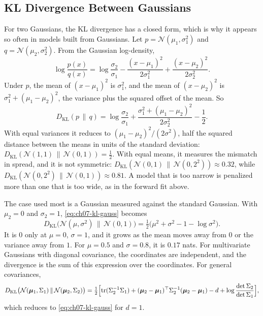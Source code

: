 \subsection{KL Divergence Between Gaussians}
\label{sec:ch07-kl-gaussian}

For two Gaussians, the KL divergence has a closed form, which is why it
appears so often in models built from Gaussians. Let $p =
\mathcal{N}(\mu_1, \sigma_1^2)$ and $q = \mathcal{N}(\mu_2, \sigma_2^2)$.
From the Gaussian log-density,
\[
  \log \frac{p(x)}{q(x)}
  = \log \frac{\sigma_2}{\sigma_1}
  - \frac{(x - \mu_1)^2}{2\sigma_1^2} + \frac{(x - \mu_2)^2}{2\sigma_2^2} .
\]
Under $p$, the mean of $(x - \mu_1)^2$ is $\sigma_1^2$, and the mean of
$(x - \mu_2)^2$ is $\sigma_1^2 + (\mu_1 - \mu_2)^2$, the variance plus the
squared offset of the mean. So
\begin{equation}
  D_{\mathrm{KL}}(p \,\|\, q)
  = \log \frac{\sigma_2}{\sigma_1}
  + \frac{\sigma_1^2 + (\mu_1 - \mu_2)^2}{2\sigma_2^2} - \frac12 .
  \label{eq:ch07-kl-gauss}
\end{equation}
With equal variances it reduces to $(\mu_1 - \mu_2)^2/(2\sigma^2)$, half
the squared distance between the means in units of the standard
deviation: $D_{\mathrm{KL}}(\mathcal{N}(1, 1) \,\|\, \mathcal{N}(0, 1)) =
\tfrac12$. With equal means, it measures the mismatch in spread, and it
is not symmetric: $D_{\mathrm{KL}}(\mathcal{N}(0, 1) \,\|\, \mathcal{N}(0,
2^2)) \approx 0.32$, while $D_{\mathrm{KL}}(\mathcal{N}(0, 2^2) \,\|\,
\mathcal{N}(0, 1)) \approx 0.81$. A model that is too narrow is penalized
more than one that is too wide, as in the forward fit above.

The case used most is a Gaussian measured against the standard Gaussian.
With $\mu_2 = 0$ and $\sigma_2 = 1$, \cref{eq:ch07-kl-gauss} becomes
\[
  D_{\mathrm{KL}}\bigl(\mathcal{N}(\mu, \sigma^2) \,\|\, \mathcal{N}(0, 1)\bigr)
  = \tfrac12 \bigl( \mu^2 + \sigma^2 - 1 - \log \sigma^2 \bigr) .
\]
It is $0$ only at $\mu = 0$, $\sigma = 1$, and it grows as the mean moves
away from $0$ or the variance away from $1$. For $\mu = 0.5$ and $\sigma
= 0.8$, it is $0.17$ nats. For multivariate Gaussians with diagonal
covariance, the coordinates are independent, and the divergence is the
sum of this expression over the coordinates. For general covariances,
\[
  D_{\mathrm{KL}}\bigl(\mathcal{N}(\bm{\mu}_1, \Sigma_1) \,\|\,
    \mathcal{N}(\bm{\mu}_2, \Sigma_2)\bigr)
  = \tfrac12 \Bigl[ \operatorname{tr}(\Sigma_2^{-1}\Sigma_1)
    + (\bm{\mu}_2 - \bm{\mu}_1)^\top \Sigma_2^{-1}
      (\bm{\mu}_2 - \bm{\mu}_1)
    - d + \log \frac{\det \Sigma_2}{\det \Sigma_1} \Bigr] ,
\]
which reduces to \cref{eq:ch07-kl-gauss} for $d = 1$.

